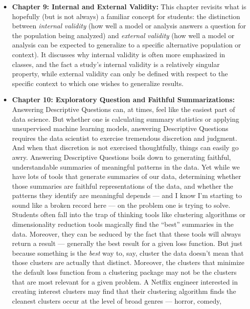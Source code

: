 \documentclass[12pt]{article}
\begin{document}
\begin{itemize}

\item
  \textbf{Chapter 9: Internal and External Validity:} This chapter
  revisits what is hopefully (but is not always) a familiar concept for
  students: the distinction between \emph{internal validity} (how well a
  model or analysis answers a question for the population being
  analyzed) and \emph{external validity} (how well a model or analysis
  can be expected to generalize to a specific alternative population or
  context). It discusses why internal validity is often more emphasized
  in classes, and the fact a study's internal validity is a relatively
  singular property, while external validity can only be defined with
  respect to the specific context to which one wishes to generalize
  results.
\item
  \textbf{Chapter 10: Exploratory Question and Faithful Summarizations:}
  Answering Descriptive Questions can, at times, feel like the easiest
  part of data science. But whether one is calculating summary
  statistics or applying unsupervised machine learning models, answering
  Descriptive Questions requires the data scientist to exercise
  tremendous discretion and judgment. And when that discretion is not
  exercised thoughtfully, things can easily go awry. Answering
  Descriptive Questions boils down to generating faithful,
  understandable summaries of meaningful patterns in the data. Yet while
  we have lots of tools that generate summaries of our data, determining
  whether those summaries are faithful representations of the data, and
  whether the patterns they identify are meaningful depends --- and I
  know I'm starting to sound like a broken record here --- on the
  problem one is trying to solve. Students often fall into the trap of
  thinking tools like clustering algorithms or dimensionality reduction
  tools magically find the ``best'' summaries in the data. Moreover,
  they can be seduced by the fact that these tools will always return a
  result --- generally the best result for a given loss function. But
  just because something is the \emph{best} way to, say, cluster the
  data doesn't mean that those clusters are actually that distinct.
  Moreover, the clusters that minimize the default loss function from a
  clustering package may not be the clusters that are most relevant for
  a given problem. A Netflix engineer interested in creating interest
  clusters may find that their clustering algorithm finds the cleanest
  clusters occur at the level of broad genres --- horror, comedy,

\end{itemize}
\end{document}
